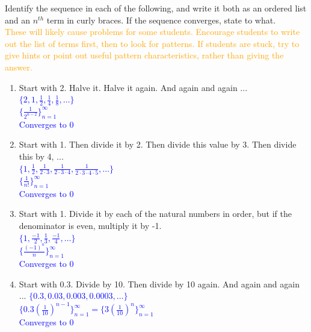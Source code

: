 \documentclass{ximera}
\begin{document}
\begin{exercise}
    Identify the sequence in each of the following, and write it both as an ordered list and an $n^{th}$ term in curly braces. If the sequence converges, state to what.\\
    \textcolor{orange}{These will likely cause problems for some students.  Encourage students to write out the list of terms first, then to look for patterns.  If students are stuck, try to give hints or point out useful pattern characteristics, rather than giving the answer.}
\begin{enumerate}
      \item Start with 2.  Halve it.  Halve it again. And again and again ... \\
    \textcolor{blue}{ $\{2, 1, \frac{1}{2}, \frac14, \frac18,\dots\}$\\
    $\{\frac{1}{2^{n-2}}\}_{n=1}^{\infty}$\\
    Converges to 0}
    \item Start with 1.  Then divide it by 2.  Then divide this value by 3.  Then divide this by 4, ... \\
    \textcolor{blue}{ $\{1, \frac{1}{2}, \frac{1}{2\cdot 3}, \frac{1}{2\cdot 3 \cdot 4}, \frac{1}{2\cdot3\cdot4\cdot5}, \dots \}$\\
    $\{\frac{1}{n!}\}_{n=1}^{\infty}$\\
    Converges to 0}
    \item Start with 1.  Divide it by each of the natural numbers in order, but if the denominator is even, multiply it by -1.\\
    \textcolor{blue}{ $\{1, \frac{-1}{2}, \frac13, \frac{-1}{4}, \dots \}$\\
    $\{\frac{(-1)^n}{n}\}_{n=1}^\infty$\\
    Converges to 0}
    \item Start with 0.3.  Divide by 10.  Then divide by 10 again.  And again and again ...
    \textcolor{blue}{ $\{0.3, 0.03, 0.003, 0.0003, \dots \}$\\
    $\{0.3(\frac{1}{10})^{n-1}\}_{n=1}^\infty=\{3(\frac{1}{10})^n\}_{n=1}^\infty$\\
    Converges to 0}
\end{enumerate}
\end{exercise}
\end{document}
